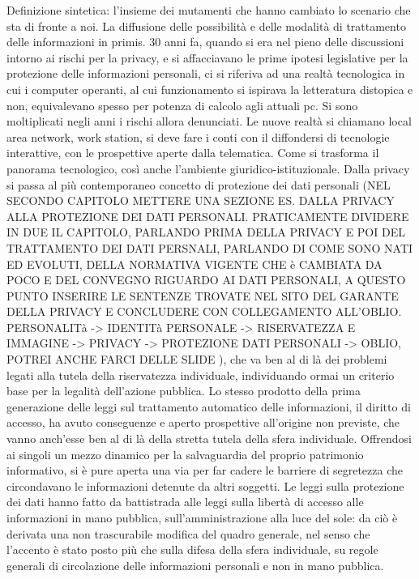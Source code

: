 Definizione sintetica: l’insieme dei mutamenti che hanno cambiato lo scenario che sta di fronte a noi. La diffusione delle possibilità e delle modalità di trattamento delle informazioni in primis.
30 anni fa, quando si era nel pieno delle discussioni intorno ai rischi per la privacy, e si affacciavano le prime ipotesi legislative per la protezione delle informazioni personali, ci si riferiva ad una realtà tecnologica in cui i computer operanti, al cui funzionamento si ispirava la letteratura distopica e non, equivalevano spesso per potenza di calcolo agli attuali pc. Si sono moltiplicati negli anni i rischi allora denunciati. 
Le nuove realtà si chiamano local area network, work station, si deve fare i conti con il diffondersi di tecnologie interattive, con le prospettive aperte dalla telematica. Come si trasforma il panorama tecnologico, così anche l’ambiente giuridico-istituzionale. Dalla privacy si passa al più contemporaneo concetto di protezione dei dati personali (NEL SECONDO CAPITOLO METTERE UNA SEZIONE ES. DALLA PRIVACY ALLA PROTEZIONE DEI DATI PERSONALI. PRATICAMENTE DIVIDERE IN DUE IL CAPITOLO, PARLANDO PRIMA DELLA PRIVACY E POI DEL TRATTAMENTO DEI DATI PERSNALI, PARLANDO DI COME SONO NATI ED EVOLUTI, DELLA NORMATIVA VIGENTE CHE è CAMBIATA DA POCO E DEL CONVEGNO RIGUARDO AI DATI PERSONALI, A QUESTO PUNTO INSERIRE LE SENTENZE TROVATE NEL SITO DEL GARANTE DELLA PRIVACY E CONCLUDERE CON COLLEGAMENTO ALL’OBLIO. PERSONALITà -> IDENTITà PERSONALE -> RISERVATEZZA E IMMAGINE -> PRIVACY -> PROTEZIONE DATI PERSONALI -> OBLIO, POTREI ANCHE FARCI DELLE SLIDE ), che va ben al di là dei problemi legati alla tutela della riservatezza individuale, individuando ormai un criterio base per la legalità dell’azione pubblica.
Lo stesso prodotto della prima generazione delle leggi sul trattamento automatico delle informazioni, il diritto di accesso, ha avuto conseguenze e aperto prospettive all’origine non previste, che vanno anch’esse ben al di là della stretta tutela della sfera individuale. Offrendosi ai singoli un mezzo dinamico per la salvaguardia del proprio patrimonio informativo, si è pure aperta una via per far cadere le barriere di segretezza che circondavano le informazioni detenute da altri soggetti. Le leggi sulla protezione dei dati hanno fatto da battistrada alle leggi sulla libertà di accesso alle informazioni in mano pubblica, sull’amministrazione alla luce del sole: da ciò è derivata una non trascurabile modifica del quadro generale, nel senso che l’accento è stato posto più che sulla difesa della sfera individuale, su regole generali di circolazione delle informazioni personali e non in mano pubblica.
